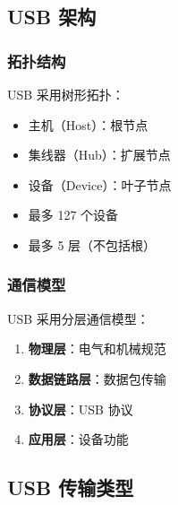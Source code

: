 \subsection{USB 架构}

\subsubsection{拓扑结构}

USB 采用树形拓扑：
\begin{itemize}
  \item 主机（Host）：根节点
  \item 集线器（Hub）：扩展节点
  \item 设备（Device）：叶子节点
  \item 最多 127 个设备
  \item 最多 5 层（不包括根）
\end{itemize}

\subsubsection{通信模型}

USB 采用分层通信模型：
\begin{enumerate}
  \item \textbf{物理层}：电气和机械规范
  \item \textbf{数据链路层}：数据包传输
  \item \textbf{协议层}：USB 协议
  \item \textbf{应用层}：设备功能
\end{enumerate}

\subsection{USB 传输类型}

